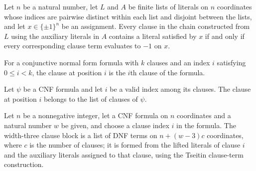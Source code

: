 \begin{theorem}
\label{FABL.literalListsHold_iff_tseitinClauseTerms}
\leanok
{}
Let $n$ be a natural number, let $L$ and $A$ be finite lists of literals on $n$
coordinates whose indices are pairwise distinct within each list and disjoint between
the lists, and let $x\in\{\pm1\}^n$ be an assignment. Every clause in the chain
constructed from $L$ using the auxiliary literals in $A$ contains a literal satisfied by
$x$ if and only if every corresponding clause term evaluates to $-1$ on $x$.
\end{theorem}

\begin{definition}
\label{FABL.CNFFormula.clauseAt}
\leanok
{}
For a conjunctive normal form formula with $k$ clauses and an index $i$ satisfying $0\le
i<k$, the clause at position $i$ is the $i$th clause of the formula.
\end{definition}

\begin{theorem}
\label{FABL.CNFFormula.clauseAt_mem}
\leanok
{}
Let $\psi$ be a CNF formula and let $i$ be a valid index among its clauses. The clause
at position $i$ belongs to the list of clauses of $\psi$.
\end{theorem}

\begin{definition}
\label{FABL.widthThreeTseitinClauseBlock}
\leanok
{}
Let $n$ be a nonnegative integer, let a CNF formula on $n$ coordinates and a natural
number $w$ be given, and choose a clause index $i$ in the formula. The width-three
clause block is a list of DNF terms on $n+(w-3)c$ coordinates, where $c$ is the number
of clauses; it is formed from the lifted literals of clause $i$ and the auxiliary
literals assigned to that clause, using the Tseitin clause-term construction.
\end{definition}

